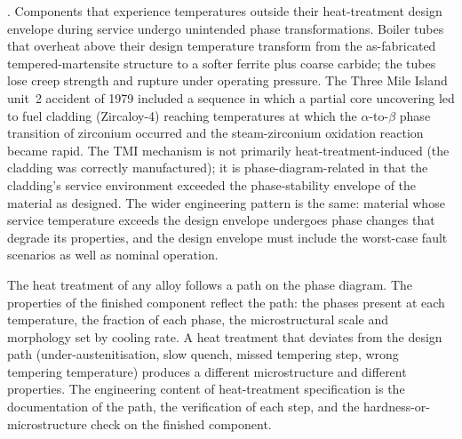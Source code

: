 . Components that experience temperatures outside their
heat-treatment design envelope during service undergo unintended
phase transformations. Boiler tubes that overheat above their design
temperature transform from the as-fabricated tempered-martensite
structure to a softer ferrite plus coarse carbide; the tubes lose
creep strength and rupture under operating pressure. The
Three Mile Island unit~2 accident of 1979 \cite{acc:kemeny-tmi-1979}
included a sequence in which a partial core uncovering led to fuel
cladding (Zircaloy-4) reaching temperatures at which the
$\alpha$-to-$\beta$ phase transition of zirconium occurred and the
steam-zirconium oxidation reaction became rapid. The TMI mechanism is
not primarily heat-treatment-induced (the cladding was correctly
manufactured); it is phase-diagram-related in that the cladding's
service environment exceeded the phase-stability envelope of the
material as designed. The wider engineering pattern is the same:
material whose service temperature exceeds the design envelope
undergoes phase changes that degrade its properties, and the design
envelope must include the worst-case fault scenarios as well as
nominal operation.

\begin{principle}
The heat treatment of any alloy follows a path on the phase diagram.
The properties of the finished component reflect the path: the
phases present at each temperature, the fraction of each phase, the
microstructural scale and morphology set by cooling rate. A heat
treatment that deviates from the design path (under-austenitisation,
slow quench, missed tempering step, wrong tempering temperature)
produces a different microstructure and different properties. The
engineering content of heat-treatment specification is the
documentation of the path, the verification of each step, and the
hardness-or-microstructure check on the finished component.
\end{principle}

